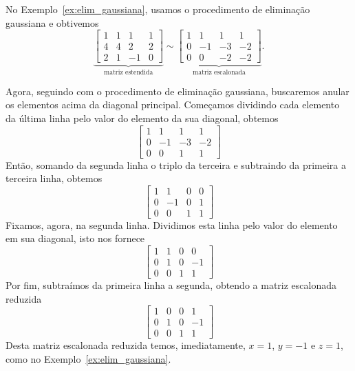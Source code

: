 \begin{ex}
  No Exemplo~\ref{ex:elim_gaussiana}, usamos o procedimento de eliminação gaussiana e obtivemos
  \begin{equation}
      \underbrace{
        \begin{bmatrix}
          1 & 1 & 1 & 1\\
          4 & 4 & 2 & 2\\
          2 & 1 & -1 & 0
        \end{bmatrix}
}_{\text{matriz estendida}} \sim
      \underbrace{
        \begin{bmatrix}
          1 & 1 & 1 & 1\\
          0 & -1 & -3 & -2\\
          0 & 0 & -2 & -2
        \end{bmatrix}
}_{\text{matriz escalonada}}.
  \end{equation}

Agora, seguindo com o procedimento de eliminação gaussiana, buscaremos anular os elementos acima da diagonal principal. Começamos dividindo cada elemento da última linha pelo valor do elemento da sua diagonal, obtemos
\begin{equation}
  \begin{bmatrix}
    1 & 1 & 1 & 1\\
    0 & -1 & -3 & -2\\
    0 & 0 & 1 & 1
  \end{bmatrix}
\end{equation}
Então, somando da segunda linha o triplo da terceira e subtraindo da primeira a terceira linha, obtemos
\begin{equation}
  \begin{bmatrix}
    1 & 1 & 0 & 0\\
    0 & -1 & 0 & 1\\
    0 & 0 & 1 & 1
  \end{bmatrix}
\end{equation}
Fixamos, agora, na segunda linha. Dividimos esta linha pelo valor do elemento em sua diagonal, isto nos fornece
\begin{equation}
  \begin{bmatrix}
    1 & 1 & 0 & 0\\
    0 & 1 & 0 & -1\\
    0 & 0 & 1 & 1
  \end{bmatrix}
\end{equation}
Por fim, subtraímos da primeira linha a segunda, obtendo a matriz escalonada reduzida
\begin{equation}
  \begin{bmatrix}
    1 & 0 & 0 & 1\\
    0 & 1 & 0 & -1\\
    0 & 0 & 1 & 1
  \end{bmatrix}
\end{equation}
Desta matriz escalonada reduzida temos, imediatamente, $x=1$, $y=-1$ e $z=1$, como no Exemplo~\ref{ex:elim_gaussiana}.


\end{ex}
